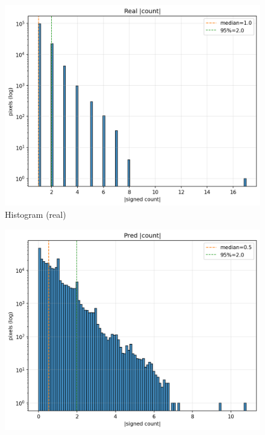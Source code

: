 \begin{figure}[t]
  \centering
  \begin{minipage}[t]{0.32\linewidth}
    \centering
    \includegraphics[width=\linewidth]{images/main_results/window1/hist_real.png}\\[-2pt]
    \footnotesize Histogram (real)
  \end{minipage}\hfill
  \begin{minipage}[t]{0.32\linewidth}
    \centering
    \includegraphics[width=\linewidth]{images/main_results/window1/hist_pred.png}\\[-2pt]

\end{minipage}
\end{figure}
